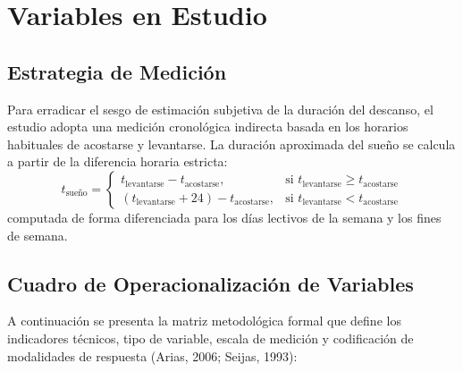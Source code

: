 \documentclass[12pt, letterpaper]{article}
\begin{document}
\section{Variables en Estudio}

\subsection{Estrategia de Medición}
Para erradicar el sesgo de estimación subjetiva de la duración del descanso, el estudio adopta una medición cronológica indirecta basada en los horarios habituales de acostarse y levantarse. La duración aproximada del sueño se calcula a partir de la diferencia horaria estricta:
\begin{equation}
    t_{\text{sueño}} = 
    \begin{cases} 
        t_{\text{levantarse}} - t_{\text{acostarse}}, & \text{si } t_{\text{levantarse}} \ge t_{\text{acostarse}} \\
        (t_{\text{levantarse}} + 24) - t_{\text{acostarse}}, & \text{si } t_{\text{levantarse}} < t_{\text{acostarse}}
    \end{cases}
\end{equation}
computada de forma diferenciada para los días lectivos de la semana y los fines de semana.

\subsection{Cuadro de Operacionalización de Variables}

A continuación se presenta la matriz metodológica formal que define los indicadores técnicos, tipo de variable, escala de medición y codificación de modalidades de respuesta (Arias, 2006; Seijas, 1993):
\end{document}
